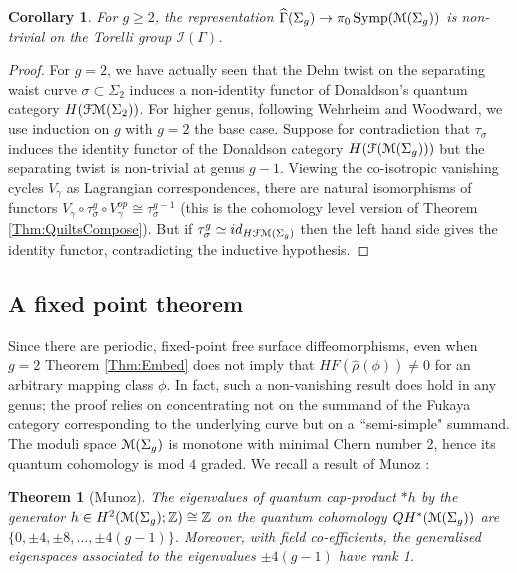 \documentclass[reqno,10pt]{amsart}
\numberwithin{equation}{section}
\newcommand{\bZ}{{\mathbb Z}}
\newcommand{\scrF}{\EuScript{F}}
\newcommand{\scrM}{\EuScript{M}}
\newcommand{\cI}{{\mathcal I}}
\newcommand{\Symp}{\operatorname{Symp}}
\newtheorem{Theorem}[thm]{Theorem}
\newtheorem{Corollary}[thm]{Corollary}
\theoremstyle{remark}
\begin{document}
\begin{Corollary} \label{Cor:TorelliNontrivial}
For $g\geq 2$, the representation $\widehat{\Gamma}(\Sigma_g) \rightarrow \pi_0\Symp(\scrM(\Sigma_g))$ is non-trivial on the Torelli group $\cI(\Gamma)$.
\end{Corollary}

\begin{proof}
For $g=2$, we have actually seen that the Dehn twist on the separating waist curve $\sigma\subset \Sigma_2$ induces a non-identity functor of Donaldson's quantum category $H(\scrF\scrM(\Sigma_2))$.  For higher genus, following Wehrheim and Woodward, we use induction on $g$ with $g=2$ the base case.  Suppose for contradiction that $\tau_{\sigma}$ induces the identity functor of the Donaldson category $H(\scrF(\scrM(\Sigma_g)))$ but the separating twist is non-trivial at genus $g-1$.  Viewing the co-isotropic vanishing cycles $V_{\gamma}$ as Lagrangian correspondences, there are natural isomorphisms of functors $V_{\gamma}\circ \tau_{\sigma}^g \circ V_{\gamma}^{op} \cong \tau_{\sigma}^{g-1}$ (this is the cohomology level version of Theorem \ref{Thm:QuiltsCompose}).  But if $\tau_{\sigma}^g \simeq id_{H\scrF\scrM(\Sigma_g)}$ then the left hand side gives the identity functor, contradicting the inductive hypothesis.
\end{proof}



\subsection{A fixed point theorem\label{Subsec:FixPoint}}
 Since there are periodic, fixed-point free surface diffeomorphisms, even when $g=2$ Theorem \ref{Thm:Embed} does not imply that $HF(\hat\rho(\phi)) \neq 0$ for an arbitrary mapping class $\phi$.  In fact, such a non-vanishing result does hold in any genus; the proof relies on concentrating not on the summand of the Fukaya category corresponding to the underlying curve but on a ``semi-simple" summand.  The moduli space $\scrM(\Sigma_g)$ is monotone with minimal Chern number 2, hence its quantum cohomology is mod $4$ graded.  We recall a result of Munoz \cite{Munoz}:

\begin{Theorem}[Munoz] \label{Thm:Munoz}
The eigenvalues of quantum cap-product $\ast h$ by the generator $h\in H^2(\scrM(\Sigma_g);\bZ) \cong \bZ$ on the quantum cohomology $QH^*(\scrM(\Sigma_g))$ are $\{0, \pm 4, \pm 8, \ldots, \pm 4(g-1)\}$. Moreover, with field co-efficients, the generalised eigenspaces associated to the eigenvalues $\pm 4(g-1)$ have rank 1.
\end{Theorem}
\end{document}
